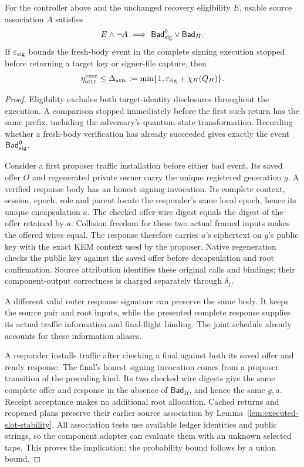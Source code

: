 \begin{proposition}
\label{prop:executed-source-attribution}
For the controller above and the unchanged recovery eligibility $E$,
usable source association $A$ satisfies
\[
 E\land\neg A\ \Longrightarrow\
       \mathsf{Bad}_{\rm sig}^{0}\lor\mathsf{Bad}_H.
\]
If $\varepsilon_{\rm sig}$ bounds the fresh-body event in the complete
signing execution stopped before returning a target key or signer-file
capture, then
\begin{equation}
 \eta_{\rm attr}^{\rm exec}
 \le\Delta_{\rm attr}
 :=\min\{1,\varepsilon_{\rm sig}+\chi_H(Q_H)\}.
 \label{eq:executed-attribution-cost}
\end{equation}
\end{proposition}
\begin{proof}
Eligibility excludes both target-identity disclosures throughout the
execution. A comparison stopped immediately before the first such
return has the same prefix, including the adversary's quantum-state
transformation. Recording whether a fresh-body verification has already
succeeded gives exactly the event $\mathsf{Bad}_{\rm sig}^{0}$.

Consider a first proposer traffic installation before either bad event.
Its saved offer $O$ and regenerated private owner carry the unique
registered generation $g$. A verified response body has an honest
signing invocation. Its complete context, session, epoch, role and parent
locate the responder's same local epoch, hence its unique encapsulation
$a$. The checked offer-wire digest equals the digest of the offer
retained by $a$. Collision freedom for these two actual framed inputs
makes the offered wires equal. The response therefore carries $a$'s
ciphertext on $g$'s public key with the exact KEM context used by the
proposer. Native regeneration checks the public key against the saved
offer before decapsulation and root confirmation. Source attribution
identifies these original calls and bindings; their component-output
correctness is charged separately through $\delta_j$.

A different valid outer response signature can preserve the same body.
It keeps the source pair and root inputs, while the presented complete
response supplies its actual traffic information and final-flight
binding. The joint schedule already accounts for these information aliases.

A responder installs traffic after checking a final against both its
saved offer and ready response. The final's honest signing invocation
comes from a proposer transition of the preceding kind. Its two checked
wire digests give the same complete offer and response in the absence
of $\mathsf{Bad}_H$, and hence the same $g,a$. Receipt acceptance makes
no additional root allocation. Cached returns and reopened plans preserve
their earlier source association by
Lemma~\ref{lem:executed-slot-stability}. All association tests use available
ledger identities and public strings, so the component adapter can
evaluate them with an unknown selected tape. This proves the implication;
the probability bound follows by a union bound.
\end{proof}


